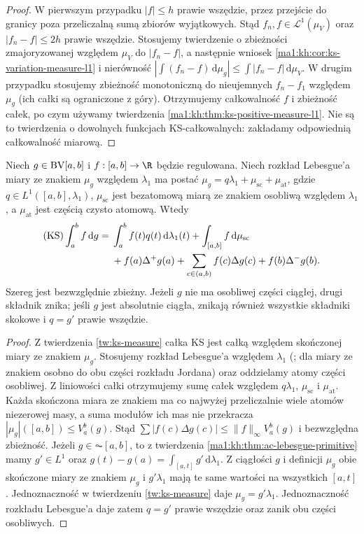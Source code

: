 \begin{proof}
W pierwszym przypadku $|f|\le h$ prawie wszędzie, przez przejście do granicy poza przeliczalną sumą zbiorów wyjątkowych. Stąd $f_n,f\in\mathcal L^1(\mu_V)$ oraz $|f_n-f|\le2h$ prawie wszędzie. Stosujemy twierdzenie o zbieżności zmajoryzowanej względem $\mu_V$ do $|f_n-f|$, a następnie wniosek \ref{ma1:kh:cor:ks-variation-measure-l1} i nierówność
$|\int(f_n-f)\,\mathrm d\mu_g|\le\int |f_n-f|\,\mathrm d\mu_V$.
W drugim przypadku stosujemy zbieżność monotoniczną do nieujemnych $f_n-f_1$ względem $\mu_g$ (ich całki są ograniczone z góry). Otrzymujemy całkowalność $f$ i zbieżność całek, po czym używamy twierdzenia \ref{ma1:kh:thm:ks-positive-measure-l1}. Nie są to twierdzenia o dowolnych funkcjach KS-całkowalnych: zakładamy odpowiednią całkowalność miarową.
\end{proof}

\begin{twierdzenie}
\label{tw:ks-decomp}
Niech $g\in\mathrm{BV}[a,b]$ i $f:[a,b]\to\R$ będzie regulowana. Niech rozkład Lebesgue'a miary ze znakiem $\mu_g$ względem $\lambda_1$ ma postać
$\mu_g=q\lambda_1+\mu_{\mathrm{sc}}+\mu_{\mathrm{at}}$, gdzie $q\in L^1([a,b],\lambda_1)$, $\mu_{\mathrm{sc}}$ jest bezatomową miarą ze znakiem osobliwą względem $\lambda_1$, a $\mu_{\mathrm{at}}$ jest częścią czysto atomową. Wtedy
\[
 \begin{aligned}
 (\mathrm{KS})\int_a^b f\,\mathrm dg
 ={}&\int_a^b f(t)q(t)\,\mathrm d\lambda_1(t)
 +\int_{[a,b]}f\,\mathrm d\mu_{\mathrm{sc}}\\
 &+f(a)\Delta^+g(a)+\sum_{c\in(a,b)}f(c)\Delta g(c)
 +f(b)\Delta^-g(b).
 \end{aligned}
\]
Szereg jest bezwzględnie zbieżny. Jeżeli $g$ nie ma osobliwej części ciągłej, drugi składnik znika; jeśli $g$ jest absolutnie ciągła, znikają również wszystkie składniki skokowe i $q=g'$ prawie wszędzie.
\end{twierdzenie}
\begin{proof}
Z twierdzenia \ref{tw:ks-measure} całka KS jest całką
względem skończonej miary ze znakiem $\mu_g$.
Stosujemy rozkład Lebesgue'a względem $\lambda_1$
(;
dla miary ze znakiem osobno do obu części rozkładu Jordana)
oraz oddzielamy atomy części osobliwej.
Z liniowości całki otrzymujemy sumę całek względem
$q\lambda_1$, $\mu_{\mathrm{sc}}$ i $\mu_{\mathrm{at}}$. Każda skończona miara ze znakiem ma co najwyżej przeliczalnie wiele atomów niezerowej masy, a suma modułów ich mas nie przekracza $|\mu_g|([a,b])\le V_a^b(g)$. Stąd $\sum|f(c)\Delta g(c)|\le\|f\|_\infty V_a^b(g)$ i bezwzględna zbieżność. Jeżeli $g\in\AC[a,b]$, to z twierdzenia
\ref{ma1:kh:thm:ac-lebesgue-primitive} mamy
$g'\in L^1$ oraz $g(t)-g(a)=\int_{[a,t]}g'\,\mathrm d\lambda_1$.
Z ciągłości $g$ i definicji $\mu_g$ obie skończone miary
ze znakiem $\mu_g$ i $g'\lambda_1$ mają te same wartości
na wszystkich $[a,t]$. Jednoznaczność w twierdzeniu
\ref{tw:ks-measure} daje $\mu_g=g'\lambda_1$.
Jednoznaczność rozkładu Lebesgue'a daje zatem
$q=g'$ prawie wszędzie oraz zanik obu części osobliwych.
\end{proof}

